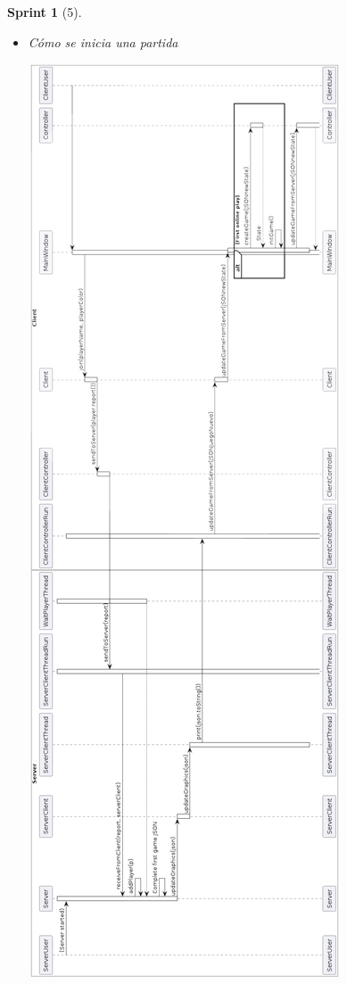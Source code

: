 \documentclass[12pt,a4paper,openright]{book}
\theoremstyle{break}
\newtheorem*{sprint}{Sprint}
\begin{document}
\begin{sprint}[5]
\begin{itemize}
\item Cómo se inicia una partida

\begin{center}
\includegraphics[scale=0.45]{empezarPartidaUml.png} 
\end{center}


\end{itemize}
\end{sprint}
\end{document}
